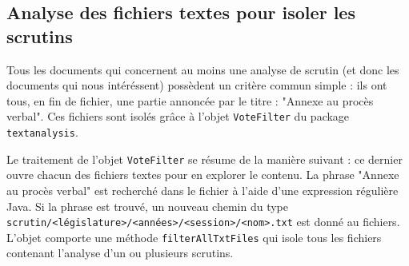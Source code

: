 \subsection{Analyse des fichiers textes pour isoler les scrutins}

Tous les documents qui concernent au moins une analyse de scrutin (et donc les documents qui nous intéréssent) possèdent un critère commun simple : ils ont tous, en fin de fichier, une partie annoncée par le titre : "Annexe au procès verbal". Ces fichiers sont isolés grâce à l'objet \verb|VoteFilter| du package \verb|textanalysis|.

Le traitement de l'objet \verb|VoteFilter| se résume de la manière suivant : ce dernier ouvre chacun des fichiers textes pour en explorer le contenu. La phrase "Annexe au procès verbal" est recherché dans le fichier à l'aide d'une expression régulière Java. Si la phrase est trouvé, un nouveau chemin du type \verb|scrutin/<législature>/<années>/<session>/<nom>.txt| est donné au fichiers. L'objet comporte une méthode \verb|filterAllTxtFiles| qui isole tous les fichiers contenant l'analyse d'un ou plusieurs scrutins.
